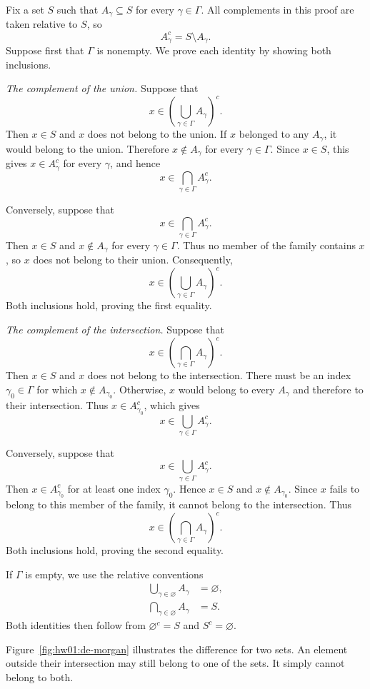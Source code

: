 Fix a set $S$ such that $A_\gamma\subseteq S$ for every
$\gamma\in\Gamma$. All complements in this proof are taken
relative to $S$, so
\[
  A_\gamma^c=S\setminus A_\gamma.
\]
Suppose first that $\Gamma$ is nonempty. We prove each identity
by showing both inclusions.

\begin{marginfigure}
  \centering
  
  \caption{The upper shaded region lies outside both sets.
    In the lower panel, only the overlap is excluded. All complements
    are taken within the rectangle $S$.}
  \label{fig:hw01:de-morgan}
\end{marginfigure}

\textit{The complement of the union.}
Suppose that
\[
  x\in\left(\bigcup_{\gamma\in\Gamma}A_\gamma\right)^c.
\]
Then $x\in S$ and $x$ does not belong to the union.
If $x$ belonged to any $A_\gamma$, it would belong to the union.
Therefore $x\notin A_\gamma$ for every $\gamma\in\Gamma$.
Since $x\in S$, this gives $x\in A_\gamma^c$ for every $\gamma$,
and hence
\[
  x\in\bigcap_{\gamma\in\Gamma}A_\gamma^c.
\]

Conversely, suppose that
\[
  x\in\bigcap_{\gamma\in\Gamma}A_\gamma^c.
\]
Then $x\in S$ and $x\notin A_\gamma$ for every $\gamma\in\Gamma$.
Thus no member of the family contains $x$, so $x$ does not belong
to their union. Consequently,
\[
  x\in\left(\bigcup_{\gamma\in\Gamma}A_\gamma\right)^c.
\]
Both inclusions hold, proving the first equality.

\clearpage

\textit{The complement of the intersection.}
Suppose that
\[
  x\in\left(\bigcap_{\gamma\in\Gamma}A_\gamma\right)^c.
\]
Then $x\in S$ and $x$ does not belong to the intersection.
There must be an index $\gamma_0\in\Gamma$ for which
$x\notin A_{\gamma_0}$. Otherwise, $x$ would belong to every
$A_\gamma$ and therefore to their intersection.
Thus $x\in A_{\gamma_0}^c$, which gives
\[
  x\in\bigcup_{\gamma\in\Gamma}A_\gamma^c.
\]

Conversely, suppose that
\[
  x\in\bigcup_{\gamma\in\Gamma}A_\gamma^c.
\]
Then $x\in A_{\gamma_0}^c$ for at least one index $\gamma_0$.
Hence $x\in S$ and $x\notin A_{\gamma_0}$.
Since $x$ fails to belong to this member of the family, it cannot
belong to the intersection. Thus
\[
  x\in\left(\bigcap_{\gamma\in\Gamma}A_\gamma\right)^c.
\]
Both inclusions hold, proving the second equality.

If $\Gamma$ is empty, we use the relative conventions
\[
  \begin{aligned}
    \bigcup_{\gamma\in\varnothing}A_\gamma&=\varnothing,\\
    \bigcap_{\gamma\in\varnothing}A_\gamma&=S.
  \end{aligned}
\]
Both identities then follow from $\varnothing^c=S$ and $S^c=\varnothing$.

Figure~\ref{fig:hw01:de-morgan} illustrates the difference for two sets.
An element outside their intersection may still belong to one
of the sets. It simply cannot belong to both.
